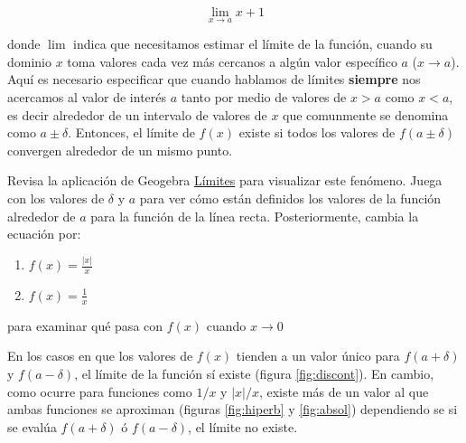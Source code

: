 \documentclass[
]{book}
\providecommand{\tightlist}{%
  \setlength{\itemsep}{0pt}\setlength{\parskip}{0pt}}
\begin{document}
\begin{equation}
\lim \limits_{x \rightarrow a} x + 1
\end{equation}

donde \(\lim\) indica que necesitamos estimar el límite de la función, cuando su dominio \(x\) toma valores cada vez más cercanos a algún valor específico \(a\) (\(x \rightarrow a\)). Aquí es necesario especificar que cuando hablamos de límites \textbf{siempre} nos acercamos al valor de interés \(a\) tanto por medio de valores de \(x>a\) como \(x<a\), es decir alrededor de un intervalo de valores de \(x\) que comunmente se denomina como \(a \pm \delta\). Entonces, el límite de \(f(x)\) existe si todos los valores de \(f(a \pm \delta)\) convergen alrededor de un mismo punto.

Revisa la aplicación de Geogebra \href{https://www.geogebra.org/classic/b76f7gpx}{Límites} para visualizar este fenómeno. Juega con los valores de \(\delta\) y \(a\) para ver cómo están definidos los valores de la función alrededor de \(a\) para la función de la línea recta. Posteriormente, cambia la ecuación por:

\begin{enumerate}
\def\labelenumi{\arabic{enumi}.}
\tightlist
\item
  \(f(x) = \frac{|x|}{x}\)
\item
  \(f(x)= \frac{1}{x}\)
\end{enumerate}

para examinar qué pasa con \(f(x)\) cuando \(x \rightarrow 0\)

En los casos en que los valores de \(f(x)\) tienden a un valor único para \(f(a + \delta)\) y \(f(a - \delta)\), el límite de la función sí existe (figura \ref{fig:discont}). En cambio, como ocurre para funciones como \(1/x\) y \(|x|/x\), existe más de un valor al que ambas funciones se aproximan (figuras \ref{fig:hiperb} y \ref{fig:absol}) dependiendo se si se evalúa \(f(a + \delta)\) ó \(f(a - \delta)\), el límite no existe.
\end{document}
